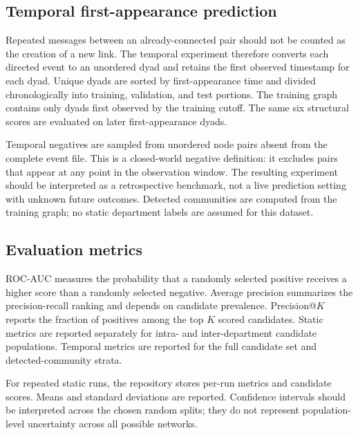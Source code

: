 \documentclass[11pt,a4paper]{article}
\begin{document}
\subsection{Temporal first-appearance prediction}
Repeated messages between an already-connected pair should not be counted as the creation of a new link. The temporal experiment therefore converts each directed event to an unordered dyad and retains the first observed timestamp for each dyad. Unique dyads are sorted by first-appearance time and divided chronologically into training, validation, and test portions. The training graph contains only dyads first observed by the training cutoff. The same six structural scores are evaluated on later first-appearance dyads.

Temporal negatives are sampled from unordered node pairs absent from the complete event file. This is a closed-world negative definition: it excludes pairs that appear at any point in the observation window. The resulting experiment should be interpreted as a retrospective benchmark, not a live prediction setting with unknown future outcomes. Detected communities are computed from the training graph; no static department labels are assumed for this dataset.

\subsection{Evaluation metrics}
ROC-AUC measures the probability that a randomly selected positive receives a higher score than a randomly selected negative. Average precision summarizes the precision-recall ranking and depends on candidate prevalence. Precision@$K$ reports the fraction of positives among the top $K$ scored candidates. Static metrics are reported separately for intra- and inter-department candidate populations. Temporal metrics are reported for the full candidate set and detected-community strata.

For repeated static runs, the repository stores per-run metrics and candidate scores. Means and standard deviations are reported. Confidence intervals should be interpreted across the chosen random splits; they do not represent population-level uncertainty across all possible networks.
\end{document}
